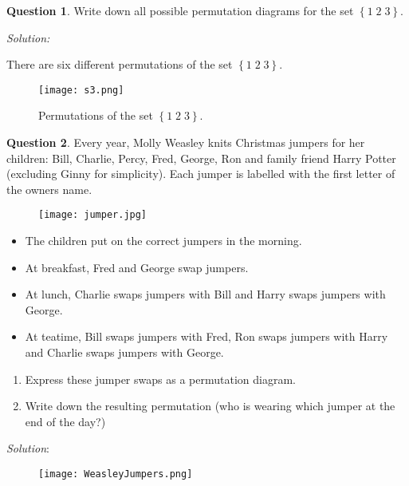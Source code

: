 \documentclass[a4paper,12pt]{article}
\theoremstyle{definition}
\newtheorem{question}{Question}%
\theoremstyle{remark}
\begin{document}
\begin{question}
Write down all possible permutation diagrams for the set $\left \{ 1\; 2\;3 \right \}$.  
\end{question}

\textit{Solution:}

There are six different permutations of the set $\left \{ 1 \;2\;3 \right \}$. 

\begin{figure*}[h!]
  \centering
  \texttt{[image: s3.png]}
  \caption{Permutations of the set $\left \{  1\; 2\; 3 \right \}.$}
\end{figure*}


\newpage
\begin{question} Every year, Molly Weasley knits Christmas jumpers for her children: Bill, Charlie, Percy, Fred, George, Ron and family friend Harry Potter (excluding Ginny for simplicity). Each jumper is labelled with the first letter of the owners name. 

  \begin{figure}[h]
    \centering
    \texttt{[image: jumper.jpg]}
  \end{figure}

  \begin{itemize}
  \item The children put on the correct jumpers in the morning. 
    \item At breakfast, Fred and George swap jumpers. 
      \item At lunch, Charlie swaps jumpers with Bill and Harry swaps jumpers with George.
        \item At teatime, Bill swaps jumpers with Fred, Ron swaps jumpers with Harry and Charlie swaps jumpers with George. 
  \end{itemize}
  \begin{enumerate}
  \item Express these jumper swaps as a permutation diagram. 
    \item Write down the resulting permutation (who is wearing which jumper at the end of the day?)
  \end{enumerate}

\end{question}

\textit{Solution}: 

  \begin{figure}[!h]
    \centering
    \texttt{[image: WeasleyJumpers.png]}
  \end{figure}
\end{document}
